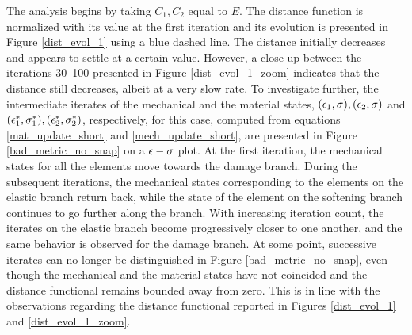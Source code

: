 \documentclass[10pt,review]{cas-sc}
\begin{document}
The analysis begins by taking $C_1,C_2$ equal to $E$. The distance function is normalized with its value at the first iteration and its evolution is presented in Figure \ref{dist_evol_1} using a blue dashed line. The distance initially decreases and appears to settle at a certain value. However, a close up between the iterations 30--100 presented in Figure \ref{dist_evol_1_zoom} indicates that the distance still decreases, albeit at a very slow rate. To investigate further, the intermediate iterates of the mechanical and the material states, $({\epsilon}_1,{\sigma}),({\epsilon}_2,{\sigma})$ and $({\epsilon}^*_1,{\sigma}_1^*),({\epsilon}^*_2,{\sigma}^*_2)$, respectively, for this case, computed from equations \eqref{mat_update_short} and \eqref{mech_update_short}, are presented in Figure \ref{bad_metric_no_snap} on a $\epsilon-{\sigma}$ plot. At the first iteration, the mechanical states for all the elements move towards the damage branch. During the subsequent iterations, the mechanical states corresponding to the elements on the elastic branch return back, while the state of the element on the softening branch continues to go further along the branch. With increasing iteration count, the iterates on the elastic branch become progressively closer to one another, and the same behavior is observed for the damage branch. At some point, successive iterates can no longer be distinguished in Figure \ref{bad_metric_no_snap}, even though the mechanical and the material states have not coincided and the distance functional remains bounded away from zero. This is in line with the observations regarding the distance functional reported in Figures \ref{dist_evol_1} and \ref{dist_evol_1_zoom}.
\end{document}
